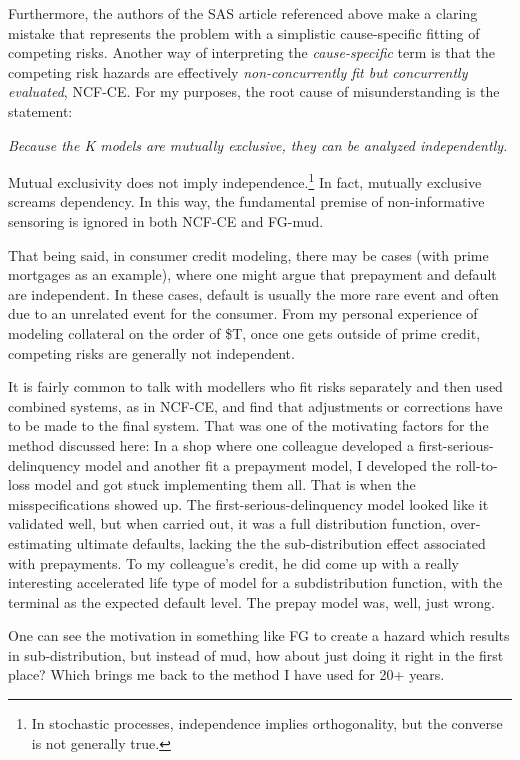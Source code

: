 \documentclass[10pt]{article}
\begin{document}
Furthermore, the authors of the SAS article referenced above make a claring mistake that represents the problem with
a simplistic cause-specific fitting of competing risks.  Another way of interpreting the {\em cause-specific}
term is that the competing risk hazards are effectively {\em non-concurrently fit but 
concurrently evaluated}, NCF-CE.  For my purposes, the root cause of misunderstanding is the statement:
\begin{center}
\it Because the K models are mutually exclusive, they can be analyzed independently.
\end{center}
Mutual exclusivity does not imply independence.\footnote{In stochastic processes, independence implies 
orthogonality, but the converse is not generally true.}  In fact, mutually exclusive screams dependency.
In this way, the fundamental premise of 
non-informative sensoring is ignored in both NCF-CE and FG-mud.

That being said, in consumer credit modeling, there may be cases (with prime mortgages as an example), 
where one might argue that prepayment and default are independent. In these cases, default is usually 
the more rare event and often due to an unrelated event for the consumer. 
From my personal experience of modeling collateral on the order of \$T,
once one gets outside of prime credit, competing risks are generally not independent.

It is fairly common to talk with modellers who fit risks separately and then used combined systems, as in NCF-CE,
and find that adjustments or corrections have to be made to the final system.  That was one of the motivating factors
for the method discussed here:  In a shop where one colleague developed a first-serious-delinquency model and
another fit a prepayment model, I developed the roll-to-loss model and got stuck implementing them all.  
That is when the misspecifications showed up.  The first-serious-delinquency model looked like it validated well, 
but when carried out, it was a full distribution function, over-estimating ultimate defaults, lacking
the the sub-distribution effect associated with prepayments.
To my colleague's credit, he did come up with a really interesting accelerated life type of model 
for a subdistribution function, with the terminal as the expected default level.
The prepay model was, well, just wrong.

One can see the motivation in something like FG to create a hazard which results in sub-distribution, 
but instead of mud, how about just doing it right in the first place?  
Which brings me back to the method I have used for 20+ years. 
\end{document}
